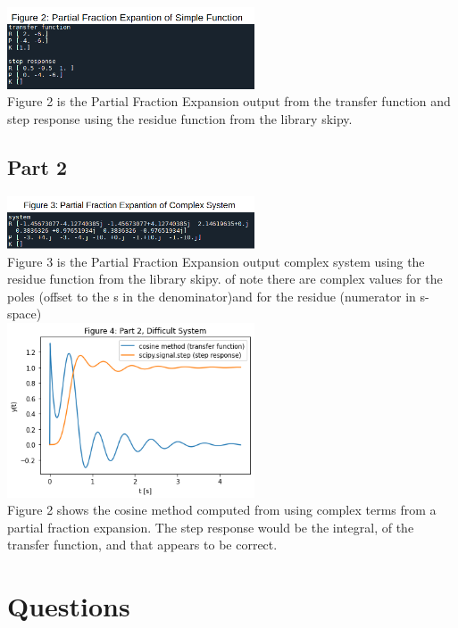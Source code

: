 \documentclass[12pt,a4paper]{article}
\begin{document}
\includegraphics[width=0.55\textwidth]{Figure2.png}\\
Figure 2 is the Partial Fraction Expansion output from the transfer function and step response using the residue function from the library skipy.\\

\subsection*{Part 2}

\includegraphics[width=0.55\textwidth]{Figure3.png}\\
Figure 3 is the Partial Fraction Expansion output complex system using the residue function from the library skipy.  of note there are complex values for the poles (offset to the s in the denominator)and for the residue (numerator in s-space)\\

\includegraphics[width=0.55\textwidth]{Figure4.png}\\
Figure 2 shows the cosine method computed from using complex terms from a partial fraction expansion.  The step response would be the integral, of the transfer function, and that appears to be correct.\\



\section{Questions}\label{sec:res}
\end{document}
